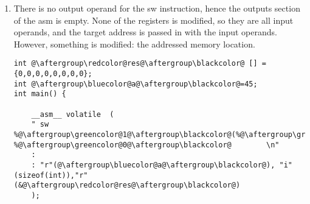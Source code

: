 \begin{enumerate}[start=0]
\begin{enumerate}
\begin{lstlisting}
	: [@\aftergroup\greencolor@out@\aftergroup\blackcolor@] "=&r" (A[2])
	: [@\aftergroup\greencolor@op1@\aftergroup\blackcolor@] "r" (A[0]),	[@\aftergroup\greencolor@op2@\aftergroup\blackcolor@] "r" (A[1])
	);
	return 0;
}
	\end{lstlisting}
	\item There is no output operand for the sw instruction, hence the outputs section of the asm is empty. None of the registers is modified, so they are all input operands, and the target address is passed in with
	the input operands. However, something is modified: the addressed
	memory location.
	\begin{lstlisting}
int @\aftergroup\redcolor@res@\aftergroup\blackcolor@ [] = {0,0,0,0,0,0,0,0};
int @\aftergroup\bluecolor@a@\aftergroup\blackcolor@=45;
int main() {
	
	__asm__ volatile  ( 
	" sw    %@\aftergroup\greencolor@1@\aftergroup\blackcolor@(%@\aftergroup\greencolor@2@\aftergroup\blackcolor@),	%@\aftergroup\greencolor@0@\aftergroup\blackcolor@        \n"
	:
	: "r"(@\aftergroup\bluecolor@a@\aftergroup\blackcolor@), "i"(sizeof(int)),"r"(&@\aftergroup\redcolor@res@\aftergroup\blackcolor@)
	);
	

\end{lstlisting}
\end{enumerate}
\end{enumerate}
